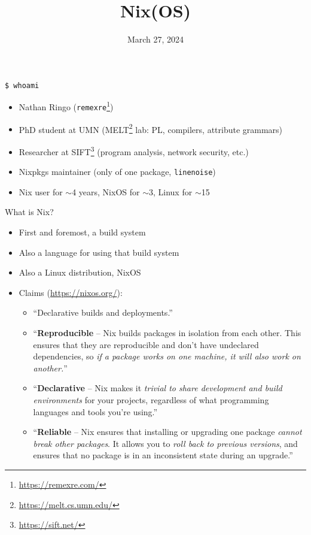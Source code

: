 \documentclass[aspectratio=169, notes]{beamer}
\title{Nix(OS)}
\date{March 27, 2024}
\begin{document}
\frame{\titlepage}

\begin{frame}{\texttt{\$ whoami}}
	\begin{itemize}
		\item Nathan Ringo (\texttt{remexre}\footnote{\url{https://remexre.com/}})
		\item PhD student at UMN (MELT\footnote{\url{https://melt.cs.umn.edu/}} lab: PL, compilers, attribute grammars)
		\item Researcher at SIFT\footnote{\url{https://sift.net/}} (program analysis, network security, etc.)
		\item Nixpkgs maintainer (only of one package, \texttt{linenoise})
		\item Nix user for $\sim$4 years, NixOS for $\sim$3, Linux for $\sim$15
	\end{itemize}
\end{frame}

\begin{frame}{What is Nix?}
	\begin{itemize}
		\item First and foremost, a build system
		\item Also a language for using that build system
		\item Also a Linux distribution, NixOS
		\item Claims (\url{https://nixos.org/}):
		      \begin{itemize}
			      \item ``Declarative builds and deployments.''
			      \item ``\textbf{Reproducible} -- Nix builds packages in isolation from each other. This ensures that they are reproducible and don't have undeclared dependencies, so \emph{if a package works on one machine, it will also work on another.}''
			      \item ``\textbf{Declarative} -- Nix makes it \emph{trivial to share development and build environments} for your projects, regardless of what programming languages and tools you're using.''
			      \item ``\textbf{Reliable} -- Nix ensures that installing or upgrading one package \emph{cannot break other packages}. It allows you to \emph{roll back to previous versions}, and ensures that no package is in an inconsistent state during an upgrade.''
		      \end{itemize}
	\end{itemize}
\end{frame}
\end{document}
